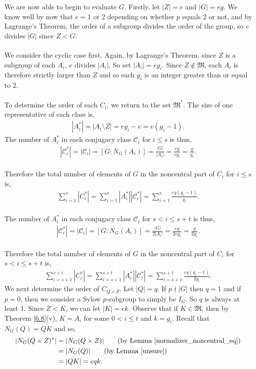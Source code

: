 We are now able to begin to evaluate $G$. Firstly, let $|Z| = e$ and $|G| = eg$. We know well by now that $e = 1$ or 2 depending on whether $p$ equals 2 or not, and by Lagrange's Theorem, the order of a subgroup divides the order of the group, so $e$ divides $|G|$ since $Z < G$. \\
\\
We consider the cyclic case first. Again, by Lagrange's Theorem, since $Z$ is a subgroup of each $A_i$, $e$ divides $|A_i|$. So set $|A_i| = eg_i$. Since $Z \notin \mathfrak{M}$, each $A_i$ is therefore strictly larger than $Z$ and so each $g_i$ is an integer greater than or equal to 2. \\
\\
To determine the order of each $C_i$, we return to the set $\mathfrak{M}^*$. The size of one representative of each class is,
\begin{align*} |A_i^*| = |A_i \! \setminus \! Z| = eg_i-e = e(g_i-1). \end{align*}
The number of $A_i^*$ in each conjugacy class $\mathcal{C}_i$ for $i \leq s$ is thus,
\begin{align*} |\mathcal{C}_i^*| = |\mathcal{C}_i| = [G:N_G(A_i)] = \frac{|G|}{|A_i|} = \frac{eg}{eg_i} = \frac{g}{g_i}. \end{align*}
\\
Therefore the total number of elements of $G$ in the noncentral part of $C_i$ for $i \leq s$ is,
\begin{align} \label{classeq1of3} \sum_{i=1}^{s} |C_i^*| = \sum_{i=1}^{s} |A_i^*| |\mathcal{C}_i^*| = \sum_{i=1}^{s} \frac{eg(g_i-1)}{g_i}.
\end{align}
\\
The number of $A_i^*$ in each conjugacy class $\mathcal{C}_i$ for $s < i \leq s+t$ is thus,
\begin{align*} |\mathcal{C}_i^*| = |\mathcal{C}_i| = [G:N_G(A_i)] = \frac{|G|}{2|A_i|} = \frac{eg}{2eg_i} = \frac{g}{2g_i}. \end{align*}
\\
Therefore the total number of elements of $G$ in the noncentral part of $C_i$ for $s < i \leq s+t$ is,
\begin{align}\label{classeq2of3} \sum_{i=s+1}^{s+t} |C_i^*| = \sum_{i=s+1}^{s+t} |A_i^*| |\mathcal{C}_i^*| = \sum_{i=s+1}^{s+t} \frac{eg(g_i-1)}{2g_i}.
\end{align}
We next determine the order of $C_{Q \times Z}$. Let $|Q| = q$. If $p \nmid |G|$ then $q=1$ and if $p = 0$, then we consider a Sylow $p$-subgroup to simply be $I_G$. So $q$ is always at least 1. Since $Z < K$, we can let $|K| = ek$. Observe that if $K \in \mathfrak{M}$, then by Theorem \ref{6.8}(v), $K = A_i$ for some $0 < i \leq t$ and $k = g_i$. Recall that $N_G(Q) = QK$ and so,
\begin{align*} |N_G(Q \times Z)^*| &= |N_G(Q \times Z)|  \tag{by Lemma \ref{normalizer_noncentral_eq}}
\\ &= |N_G(Q)| \tag{by Lemma \ref{unsure}}
\\ &= |QK| = eqk.
\end{align*}

